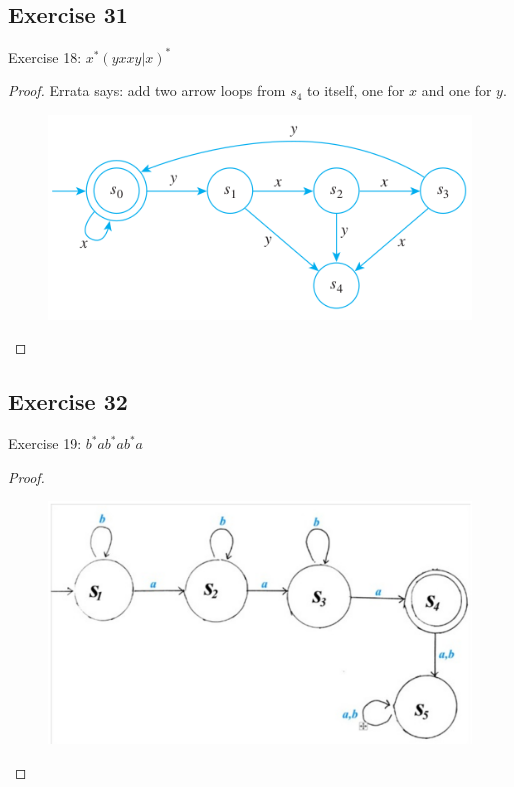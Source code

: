 \documentclass[14pt]{extarticle}
\begin{document}
\subsection{Exercise 31}
Exercise 18: \(x^*(yxxy | x)^*\)
\begin{proof}
    Errata says: add two arrow loops from \(s_4\) to itself, one for \(x\) and one for \(y\).

    \begin{figure}[ht!]
        \centering
        \includegraphics[scale=0.5]{../images/12.2.31.png}
    \end{figure}
\end{proof}

\subsection{Exercise 32}
Exercise 19: \(b^*ab^*ab^*a\)
\begin{proof}
    \begin{figure}[ht!]
        \centering
        \includegraphics[scale=0.2]{../images/12.2.32.png}
    \end{figure}
\end{proof}
\end{document}
